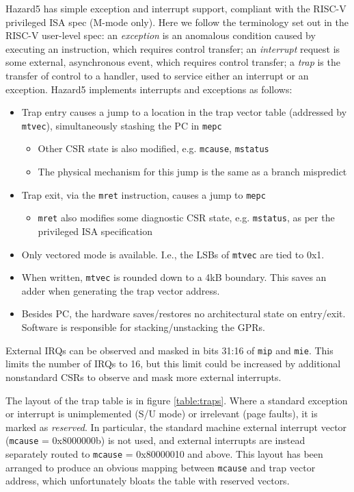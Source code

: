 Hazard5 has simple exception and interrupt support, compliant with the RISC-V privileged ISA spec (M-mode only). Here we follow the terminology set out in the RISC-V user-level spec: an {\it exception} is an anomalous condition caused by executing an instruction, which requires control transfer; an {\it interrupt} request is some external, asynchronous event, which requires control transfer; a {\it trap} is the transfer of control to a handler, used to service either an interrupt or an exception. Hazard5 implements interrupts and exceptions as follows:

\begin{itemize}
	\item Trap entry causes a jump to a location in the trap vector table (addressed by {\tt mtvec}), simultaneously stashing the PC in {\tt mepc}
	\begin{itemize}
		\item Other CSR state is also modified, e.g. {\tt mcause}, {\tt mstatus}
		\item The physical mechanism for this jump is the same as a branch mispredict
	\end{itemize}
	\item Trap exit, via the {\tt mret} instruction, causes a jump to {\tt mepc}
	\begin{itemize}
		\item {\tt mret} also modifies some diagnostic CSR state, e.g. {\tt mstatus}, as per the privileged ISA specification
	\end{itemize}
	\item Only vectored mode is available. I.e., the LSBs of {\tt mtvec} are tied to 0x1.
	\item When written, {\tt mtvec} is rounded down to a 4kB boundary. This saves an adder when generating the trap vector address.
	\item Besides PC, the hardware saves/restores no architectural state on entry/exit. Software is responsible for stacking/unstacking the GPRs.
\end{itemize}

External IRQs can be observed and masked in bits 31:16 of {\tt mip} and {\tt mie}. This limits the number of IRQs to 16, but this limit could be increased by additional nonstandard CSRs to observe and mask more external interrupts.

The layout of the trap table is in figure \ref{table:traps}. Where a standard exception or interrupt is unimplemented (S/U mode) or irrelevant (page faults), it is marked as {\it reserved}. In particular, the standard machine external interrupt vector ({\tt mcause} = 0x8000000b) is not used, and external interrupts are instead separately routed to {\tt mcause} = 0x80000010 and above. This layout has been arranged to produce an obvious mapping between {\tt mcause} and trap vector address, which unfortunately bloats the table with reserved vectors.

